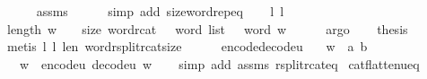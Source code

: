 \begin{isabellebody}
\ \ \ \ \isamarkupfalse%
\ assms\isanewline
\ \ \ \ \isamarkupfalse%
\ {\isacharparenleft}{\kern0pt}simp\ add{\isacharcolon}{\kern0pt}\ size{\isacharunderscore}{\kern0pt}word{\isachardot}{\kern0pt}rep{\isacharunderscore}{\kern0pt}eq{\isacharparenright}{\kern0pt}\isanewline
\ \ \isamarkupfalse%
\ l{}\ l{}\ \isamarkupfalse%
\ {\isachardoublequoteopen}length\ w\ {\isacharasterisk}{\kern0pt}\ {}\ {\isacharequal}{\kern0pt}\ size\ {\isacharparenleft}{\kern0pt}{\isacharparenleft}{\kern0pt}word{\isacharunderscore}{\kern0pt}rcat\ {\isacharcolon}{\kern0pt}{\isacharcolon}{\kern0pt}\ {}\ word\ list\ {\isasymRightarrow}\ {}{}\ word{\isacharparenright}{\kern0pt}\ w{\isacharparenright}{\kern0pt}{\isachardoublequoteclose}\isanewline
\ \ \ \ \isamarkupfalse%
\ argo\isanewline
\ \ \isamarkupfalse%
\ {\isacharquery}{\kern0pt}thesis\isanewline
\ \ \ \ \isamarkupfalse%
\ {\isacharparenleft}{\kern0pt}metis\ l{}\ l{}\ len{}\ word{\isacharunderscore}{\kern0pt}rsplit{\isacharunderscore}{\kern0pt}rcat{\isacharunderscore}{\kern0pt}size{\isacharparenright}{\kern0pt}\isanewline
{}\isamarkupfalse%
%
\endisatagproof
{\isafoldproof}%
%
\isadelimproof
\isanewline
%
\endisadelimproof
\ \ \ \ \isanewline
\isanewline
{}\isamarkupfalse%
\ encode{\isacharunderscore}{\kern0pt}decode{\isacharunderscore}{\kern0pt}u{}{}{\isacharcolon}{\kern0pt}\isanewline
\ \ \ {\isachardoublequoteopen}w\ {\isacharequal}{\kern0pt}\ {\isacharbrackleft}{\kern0pt}a{\isacharcomma}{\kern0pt}\ b{\isacharbrackright}{\kern0pt}{\isachardoublequoteclose}\isanewline
\ \ \ {\isachardoublequoteopen}w\ {\isacharequal}{\kern0pt}\ encode{\isacharunderscore}{\kern0pt}u{}{}\ {\isacharparenleft}{\kern0pt}decode{\isacharunderscore}{\kern0pt}u{}{}\ w{\isacharparenright}{\kern0pt}{\isachardoublequoteclose}\isanewline
%
\isadelimproof
\ \ %
\endisadelimproof
%
\isatagproof
{}\isamarkupfalse%
\ {\isacharparenleft}{\kern0pt}simp\ add{\isacharcolon}{\kern0pt}\ assms\ rsplit{\isacharunderscore}{\kern0pt}rcat{\isacharunderscore}{\kern0pt}eq{\isacharparenright}{\kern0pt}%
\endisatagproof
{\isafoldproof}%
%
\isadelimproof
\isanewline
%
\endisadelimproof
\isanewline
{}\isamarkupfalse%
\ cat{\isacharunderscore}{\kern0pt}flatten{\isacharunderscore}{\kern0pt}u{}{}{\isacharunderscore}{\kern0pt}eq{\isacharcolon}{\kern0pt}\isanewline

\end{isabellebody}
